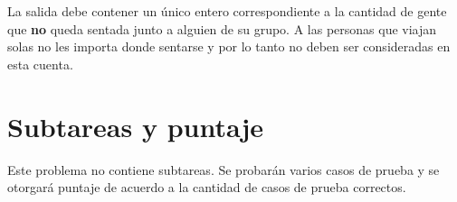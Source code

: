 \documentclass{oci}
\begin{document}
\begin{outputDescription}
  La salida debe contener un único entero correspondiente a la cantidad de
  gente que \textbf{no} queda sentada junto a alguien de su grupo.
  A las personas que viajan solas no les importa donde sentarse y por lo tanto
  no deben ser consideradas en esta cuenta.
\end{outputDescription}

\section*{Subtareas y puntaje}
Este problema no contiene subtareas.
Se probarán varios casos de prueba y se otorgará puntaje de acuerdo a la
cantidad de casos de prueba correctos.

\begin{sampleDescription}
\end{sampleDescription}
\end{document}
